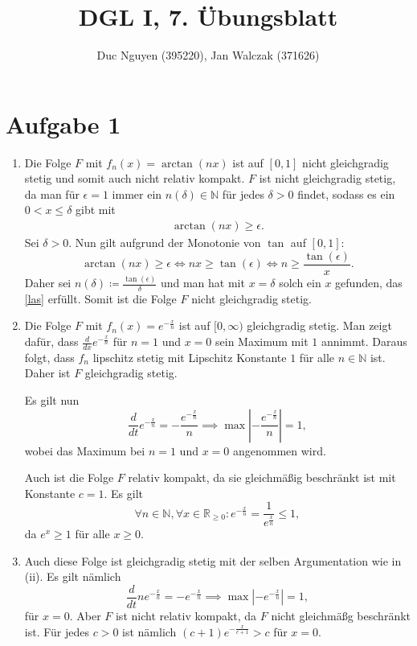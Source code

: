 \documentclass[10pt,a4paper]{article}
\title{DGL I, 7. Übungsblatt}
\author{Duc Nguyen (395220), Jan Walczak (371626)}
\date{}
\begin{document}
\maketitle

\section*{Aufgabe 1}
\begin{enumerate}[label=(\roman*)]
	\item Die Folge $F$ mit $f_n(x) = \arctan(nx)$ ist auf $[0,1]$ nicht gleichgradig stetig und somit auch nicht relativ kompakt. $F$ ist nicht gleichgradig stetig, da man für $\epsilon = 1$ immer ein $n(\delta) \in \mathbb N$ für jedes $\delta > 0$ findet, sodass es ein $0 < x \leq \delta$ gibt mit
	\begin{align}\label{las}
		\arctan(nx) \geq \epsilon. 
	\end{align}
	Sei $\delta > 0$. Nun gilt aufgrund der Monotonie von $\tan$ auf $[0,1]$:
	\[
		\arctan(nx) \geq \epsilon \iff nx \geq \tan(\epsilon) \iff n \geq \frac{\tan(\epsilon)}{x}.
	\]
	Daher sei $n(\delta) \coloneqq \frac{\tan(\epsilon)}{\delta}$ und man hat mit $x = \delta$ solch ein $x$ gefunden, das \eqref{las} erfüllt. Somit ist die Folge $F$ nicht gleichgradig stetig.
	
	\item Die Folge $F$ mit $f_n(x) = e^{-\frac{x}{n}}$ ist auf $[0,\infty)$ gleichgradig stetig. Man zeigt dafür, dass $\frac{d}{dx}e^{-\frac{x}{n}}$ für $n=1$ und $x=0$ sein Maximum mit $1$ annimmt. Daraus folgt, dass $f_n$ lipschitz stetig mit Lipschitz Konstante $1$ für alle $n \in \mathbb N$ ist. Daher ist $F$ gleichgradig stetig.
	
	Es gilt nun
	\[
		\frac{d}{dt}e^{-\frac{x}{n}} = -\frac{e^{-\frac{x}{n}}}{n} \implies \max{|-\frac{e^{-\frac{x}{n}}}{n}|} = 1,
	\]
	wobei das Maximum bei $n=1$ und $x=0$ angenommen wird.
	
	Auch ist die Folge $F$ relativ kompakt, da sie gleichmäßig beschränkt ist mit Konstante $c=1$. Es gilt
	\[
		\forall n \in \mathbb N,\forall x \in \mathbb R_{\geq 0}: e^{-\frac{x}{n}} = \frac{1}{e^{\frac{x}{n}}} \leq 1, 
	\]
	da $e^x \geq 1$ für alle $x \geq 0$. 
	
	\item Auch diese Folge ist gleichgradig stetig mit der selben Argumentation wie in (ii). Es gilt nämlich
	\[
		\frac{d}{dt}ne^{-\frac{x}{n}} = -e^{-\frac{x}{n}} \implies \max{|-e^{-\frac{x}{n}}|} = 1,
	\]
	für $x=0$. Aber $F$ ist nicht relativ kompakt, da $F$ nicht gleichmäßg beschränkt ist. Für jedes $c>0$ ist nämlich $(c+1)e^{-\frac{x}{c+1}} > c$ für $x=0$.
\end{enumerate}
\end{document}
